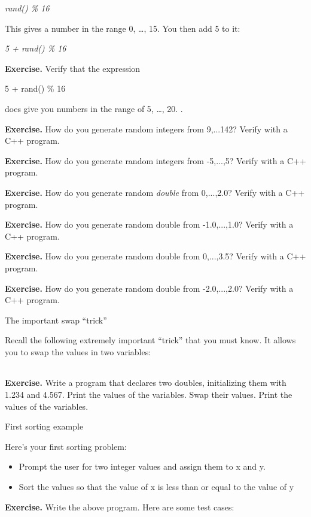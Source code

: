 \documentclass[
]{article}
\providecommand{\tightlist}{%
  \setlength{\itemsep}{0pt}\setlength{\parskip}{0pt}}
\begin{document}
\emph{rand() \% 16}

This gives a number in the range 0, \ldots, 15. You then add 5 to it:

\emph{5 + rand() \% 16}

\textbf{Exercise.} Verify that the expression

5 + rand() \% 16

does give you numbers in the range of 5, \ldots, 20. .

\textbf{Exercise.} How do you generate random integers from 9,...142?
Verify with a C++ program.

\textbf{Exercise.} How do you generate random integers from -5,...,5?
Verify with a C++ program.

\textbf{Exercise.} How do you generate random \emph{double} from
0,...,2.0? Verify with a C++ program.

\textbf{Exercise.} How do you generate random double from -1.0,...,1.0?
Verify with a C++ program.

\textbf{Exercise.} How do you generate random double from 0,...,3.5?
Verify with a C++ program.

\hfill\break

\textbf{Exercise.} How do you generate random double from -2.0,...,2.0?
Verify with a C++ program.

The important swap ``trick''

Recall the following extremely important ``trick'' that you must know.
It allows you to swap the values in two variables:

\begin{longtable}[]{@{}@{}}
\toprule
\endhead
\bottomrule
\end{longtable}

\textbf{Exercise.} Write a program that declares two doubles,
initializing them with 1.234 and 4.567. Print the values of the
variables. Swap their values. Print the values of the variables.

First sorting example

Here's your first sorting problem:

\begin{itemize}
\tightlist
\item
  Prompt the user for two integer values and assign them to x and y.
\item
  Sort the values so that the value of x is less than or equal to the
  value of y
\end{itemize}

\textbf{Exercise.} Write the above program. Here are some test cases:
\end{document}
